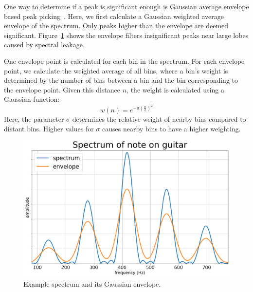 \documentclass[a4paper,10pt,twocolumn]{article}
\begin{document}
One way to determine if a peak is significant enough is Gaussian average envelope based peak picking~\cite{gausvelope}. Here, we first calculate a Gaussian weighted average envelope of the spectrum. Only peaks higher than the envelope are deemed significant. Figure~\ref{fig:gaus_env} shows the envelope filters insignificant peaks near large lobes caused by spectral leakage.

One envelope point is calculated for each bin in the spectrum. For each envelope point, we calculate the weighted average of all bins, where a bin's weight is determined by the number of bins between a bin and the bin corresponding to the envelope point. Given this distance $n$, the weight is calculated using a Gaussian function:
\[ w(n) = e^{-\pi (\frac{n}{\sigma})^2} \]
Here, the parameter $\sigma$ determines the relative weight of nearby bins compared to distant bins. Higher values for $\sigma$ causes nearby bins to have a higher weighting.
\begin{figure}[b!]
    \centering
    \includegraphics[width=\linewidth]{fig/gaus_spec.png}
    \caption{Example spectrum and its Gaussian envelope.}
    \label{fig:gaus_env}
\end{figure}
\end{document}
